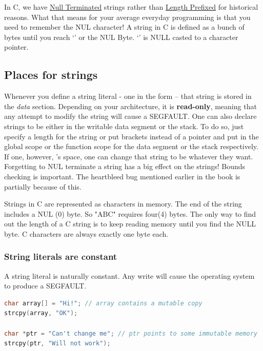 In C, we have
\href{https://en.wikipedia.org/wiki/Null-terminated_string}{Null
	Terminated} strings rather than
\href{https://en.wikipedia.org/wiki/String_(computer_science)\#Length-prefixed}{Length
	Prefixed} for historical reasons. What that means for your average everyday programming is that you need to remember the NUL character!
A string in C is defined as a bunch of bytes until you reach `\0' or the NUL Byte. `\0' is NULL casted to a character pointer.

\subsection{Places for strings}

Whenever you define a string literal - one in the form  -- that string is stored in the \emph{data} section. Depending on your architecture, it is \textbf{read-only}, meaning that any attempt to modify the string will cause a SEGFAULT.
One can also declare strings to be either in the writable data segment or the stack. To do so, just specify a length for the string or put brackets instead of a pointer  and put in the global scope or the function scope for the data segment or the stack respectively.
If one, however, 's space, one can change that string to be whatever they want.
Forgetting to NUL terminate a string has a big effect on the strings! Bounds checking is important.
The heartbleed bug mentioned earlier in the book is partially because of this.

Strings in C are represented as characters in memory.
The end of the string includes a NUL (0) byte.
So "ABC" requires four(4) bytes.
The only way to find out the length of a C string is to keep reading memory until you find the NULL byte.
C characters are always exactly one byte each.

\subsubsection{String literals are constant}

A string literal is naturally constant.
Any write will cause the operating system to produce a SEGFAULT. 

\begin{lstlisting}[language=C]
char array[] = "Hi!"; // array contains a mutable copy
strcpy(array, "OK");

char *ptr = "Can't change me"; // ptr points to some immutable memory
strcpy(ptr, "Will not work");
\end{lstlisting}

